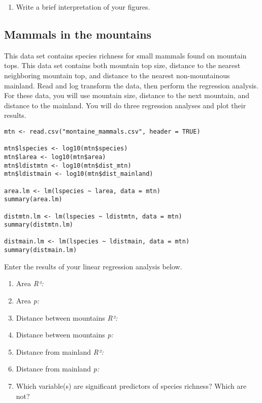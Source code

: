 \documentclass[11pt]{article}
\begin{document}
\begin{enumerate}[resume]
	\item Write a brief interpretation of your figures.
\end{enumerate}

\vspace{4\baselineskip}

\subsection*{Mammals in the mountains}

This data set contains species richness for small mammals found on mountain tops. This data set contains both mountain top size, distance to the nearest neighboring mountain top, and distance to the nearest non-mountainous mainland.  Read and log transform the data, then perform the regression analysis.  For these data, you will use mountain size, distance to the next mountain, and distance to the mainland.  You will do three regression analyses and plot their results.


\begin{verbatim}
mtn <- read.csv("montaine_mammals.csv", header = TRUE)

mtn$lspecies <- log10(mtn$species)
mtn$larea <- log10(mtn$area)
mtn$ldistmtn <- log10(mtn$dist_mtn)
mtn$ldistmain <- log10(mtn$dist_mainland)

area.lm <- lm(lspecies ~ larea, data = mtn)
summary(area.lm)

distmtn.lm <- lm(lspecies ~ ldistmtn, data = mtn)
summary(distmtn.lm)

distmain.lm <- lm(lspecies ~ ldistmain, data = mtn)
summary(distmain.lm)
\end{verbatim}

Enter the results of your linear regression analysis below.

\begin{enumerate}[resume]
	\item  Area \textit{R²:} 
	
	\item Area \textit{p:}
	
	\item  Distance between mountains \textit{R²:} 
	
	\item Distance between mountains \textit{p:}
	
	\item  Distance from mainland \textit{R²:} 
	
	\item Distance from mainland \textit{p:}
	
	\item Which variable(s) are significant predictors of species richness? Which are not?
\end{enumerate}
\end{document}
